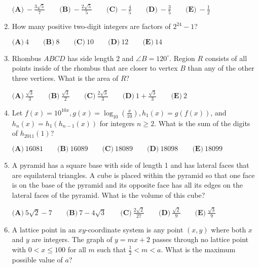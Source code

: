 \documentclass{article}
\begin{document}
\begin{enumerate}[label=\arabic*., itemsep=0.5em]
\(\textbf{(A)}\ -\frac{3\sqrt{5}}{7} \qquad \textbf{(B)}\ -\frac{2\sqrt{5}}{5} \qquad \textbf{(C)}\ -\frac{4}{5} \qquad \textbf{(D)}\ -\frac{3}{5} \qquad \textbf{(E)}\ -\frac{1}{2}\)\par \vspace{0.5em}\item How many positive two-digit integers are factors of \(2^{24}-1\)?

\(\textbf{(A)}\ 4 \qquad \textbf{(B)}\ 8 \qquad \textbf{(C)}\ 10 \qquad \textbf{(D)}\ 12 \qquad \textbf{(E)}\ 14\)\par \vspace{0.5em}\item Rhombus \(ABCD\) has side length \(2\) and \(\angle B = 120^{\circ}\). Region \(R\) consists of all points inside of the rhombus that are closer to vertex \(B\) than any of the other three vertices. What is the area of \(R\)?

\(\textbf{(A)}\ \frac{\sqrt{3}}{3} \qquad \textbf{(B)}\ \frac{\sqrt{3}}{2} \qquad \textbf{(C)}\ \frac{2\sqrt{3}}{3} \qquad \textbf{(D)}\ 1 + \frac{\sqrt{3}}{3} \qquad \textbf{(E)}\ 2\)\par \vspace{0.5em}\item Let \(f(x) = 10^{10x}, g(x) = \log_{10}\left(\frac{x}{10}\right), h_1(x) = g(f(x))\), and \(h_n(x) = h_1(h_{n-1}(x))\) for integers \(n \geq 2\). What is the sum of the digits of \(h_{2011}(1)\)?

\(\textbf{(A)}\ 16081 \qquad \textbf{(B)}\ 16089 \qquad \textbf{(C)}\ 18089 \qquad \textbf{(D)}\ 18098 \qquad \textbf{(E)}\ 18099\)\par \vspace{0.5em}\item A pyramid has a square base with side of length 1 and has lateral faces that are equilateral triangles. A cube is placed within the pyramid so that one face is on the base of the pyramid and its opposite face has all its edges on the lateral faces of the pyramid. What is the volume of this cube?

\(\textbf{(A)}\ 5\sqrt{2} - 7 \qquad \textbf{(B)}\ 7 - 4\sqrt{3} \qquad \textbf{(C)}\ \frac{2\sqrt{2}}{27} \qquad \textbf{(D)}\ \frac{\sqrt{2}}{9} \qquad \textbf{(E)}\ \frac{\sqrt{3}}{9}\)\par \vspace{0.5em}\item A lattice point in an \(xy\)-coordinate system is any point \((x, y)\) where both \(x\) and \(y\) are integers. The graph of \(y = mx + 2\) passes through no lattice point with \(0 < x \leq 100\) for all \(m\) such that \(\frac{1}{2} < m < a\). What is the maximum possible value of \(a\)?


\end{enumerate}
\end{document}
